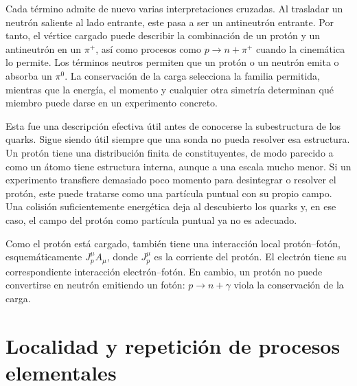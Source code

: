 Cada término admite de nuevo varias interpretaciones cruzadas. Al trasladar un neutrón saliente al lado entrante, este pasa a ser un antineutrón entrante. Por tanto, el vértice cargado puede describir la combinación de un protón y un antineutrón en un \(\pi^+\), así como procesos como \(p\to n+\pi^+\) cuando la cinemática lo permite. Los términos neutros permiten que un protón o un neutrón emita o absorba un \(\pi^0\). La conservación de la carga selecciona la familia permitida, mientras que la energía, el momento y cualquier otra simetría determinan qué miembro puede darse en un experimento concreto.

Esta fue una descripción efectiva útil antes de conocerse la subestructura de los quarks. Sigue siendo útil siempre que una sonda no pueda resolver esa estructura. Un protón tiene una distribución finita de constituyentes, de modo parecido a como un átomo tiene estructura interna, aunque a una escala mucho menor. Si un experimento transfiere demasiado poco momento para desintegrar o resolver el protón, este puede tratarse como una partícula puntual con su propio campo. Una colisión suficientemente energética deja al descubierto los quarks y, en ese caso, el campo del protón como partícula puntual ya no es adecuado.

Como el protón está cargado, también tiene una interacción local protón--fotón, esquemáticamente \(J_p^\mu A_\mu\), donde \(J_p^\mu\) es la corriente del protón. El electrón tiene su correspondiente interacción electrón--fotón. En cambio, un protón no puede convertirse en neutrón emitiendo un fotón: \(p\to n+\gamma\) viola la conservación de la carga.

\begin{classroomqa}
\end{classroomqa}

\section{Localidad y repetición de procesos elementales}

